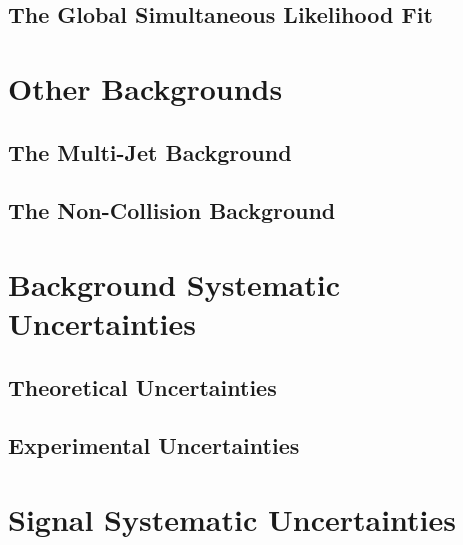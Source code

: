 \documentclass[10pt,twoside,cucitura,classica,openany]{toptesi}
\begin{document}


\subsection{The Global Simultaneous Likelihood Fit}
\label{sec:glob-simult-likel}



\section{Other Backgrounds}
\label{sec:other-backgrounds}

\subsection{The Multi-Jet Background}
\label{sec:multi-jet-background}



\subsection{The Non-Collision Background}
\label{sec:non-coll-backgr}



\section{Background Systematic Uncertainties}
\label{sec:syst-uncert}



\subsection{Theoretical Uncertainties}
\label{sec:theor-uncert}



\subsection{Experimental Uncertainties}
\label{sec:exper-uncert}



\section{Signal Systematic Uncertainties}
\label{sec:sign-syst-uncert}
\end{document}
